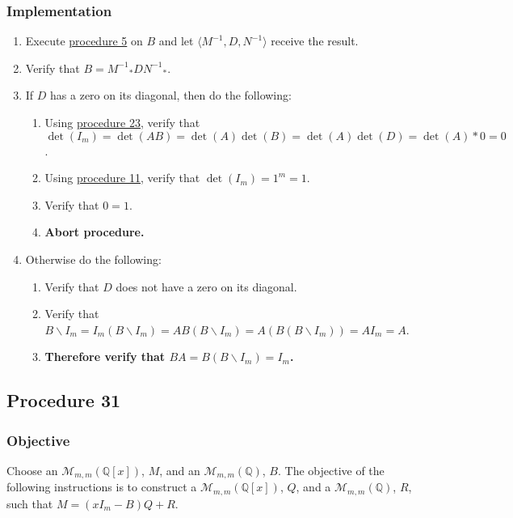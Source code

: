 \documentclass[twocolumn]{article}
\begin{document}
			\subsubsection{Implementation}
				\begin{enumerate}
					\item Execute \hyperref[sec:procedure 5]{procedure 5} on $B$ and let $\langle M^{-1},D,N^{-1}\rangle$ receive the result.
					\item Verify that $B={M^{-1}}_*D{N^{-1}}_*$.
					\item If $D$ has a zero on its diagonal, then do the following:
					\begin{enumerate}
						\item Using \hyperref[sec:procedure 23]{procedure 23}, verify that $\det(I_m)=\det(AB)=\det(A)\det(B)=\det(A)\det(D)=\det(A)*0=0$.
						\item Using \hyperref[sec:procedure 11]{procedure 11}, verify that $\det(I_m)=1^m=1$.
						\item Verify that $0=1$.
						\item \textbf{Abort procedure.}
					\end{enumerate}
					\item Otherwise do the following:
					\begin{enumerate}
						\item Verify that $D$ does not have a zero on its diagonal.
						\item Verify that $B\backslash I_m=I_m(B\backslash I_m)=AB(B\backslash I_m)=A(B(B\backslash I_m))=AI_m=A$.
						\item \textbf{Therefore verify that $BA=B(B\backslash I_m)=I_m$.}
					\end{enumerate}
				\end{enumerate}
		\subsection{Procedure 31}\label{sec:procedure 31}
			\subsubsection{Objective}
				Choose an $\mathcal{M}_{m,m}(\mathbb{Q}[x])$, $M$, and an $\mathcal{M}_{m,m}(\mathbb{Q})$, $B$. The objective of the following instructions is to construct a $\mathcal{M}_{m,m}(\mathbb{Q}[x])$, $Q$, and a $\mathcal{M}_{m,m}(\mathbb{Q})$, $R$, such that $M=(xI_m-B)Q+R$.
\end{document}
